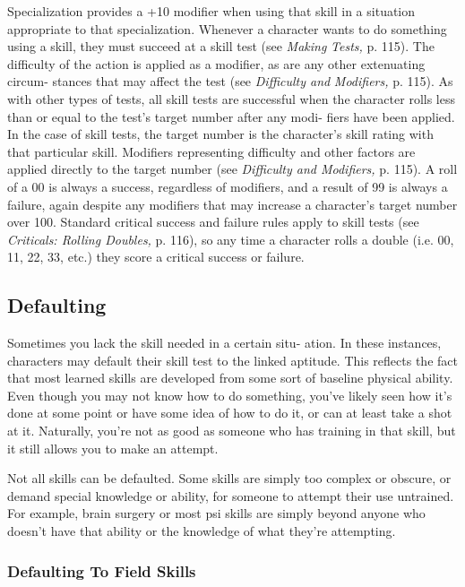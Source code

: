 Specialization provides a +10 modifier when using 
that skill in a situation appropriate to that specialization.
Whenever a character wants to do something using 
a skill, they must succeed at a skill test (see \textit{Making }
\textit{Tests,} p. 115). The difficulty of the action is applied 
as a modifier, as are any other extenuating circum-
stances that may affect the test (see \textit{Difficulty  and }
\textit{Modifiers,} p. 115). As with other types of tests, all skill 
tests are successful when the character rolls less than 
or equal to the test's target number after any modi-
fiers have been applied. In the case of skill tests, the 
target number is the character's skill rating with that 
particular skill. Modifiers representing difficulty and 
other factors are applied directly to the target number 
(see \textit{Difficulty and Modifiers,} p. 115). A roll of a 00 is 
always a success, regardless of modifiers, and a result 
of 99 is always a failure, again despite any modifiers 
that may increase a character's target number over 
100. Standard critical success and failure rules apply 
to skill tests (see \textit{Criticals: Rolling Doubles,} p. 116), 
so any time a character rolls a double (i.e. 00, 11, 22, 
33, etc.) they score a critical success or failure.

\subsection{Defaulting}

Sometimes you lack the skill needed in a certain situ-
ation. In these instances, characters may default their 
skill test to the linked aptitude. This reflects the fact 
that most learned skills are developed from some sort 
of baseline physical ability. Even though you may not 
know how to do something, you've likely seen how 
it's done at some point or have some idea of how to 
do it, or can at least take a shot at it. Naturally, you're 
not as good as someone who has training in that skill, 
but it still allows you to make an attempt.

Not all skills can be defaulted. Some skills are 
simply too complex or obscure, or demand special 
knowledge or ability, for someone to attempt their 
use untrained. For example, brain surgery or most psi 
skills are simply beyond anyone who doesn't have that 
ability or the knowledge of what they're attempting.

\subsubsection{Defaulting To Field Skills}

